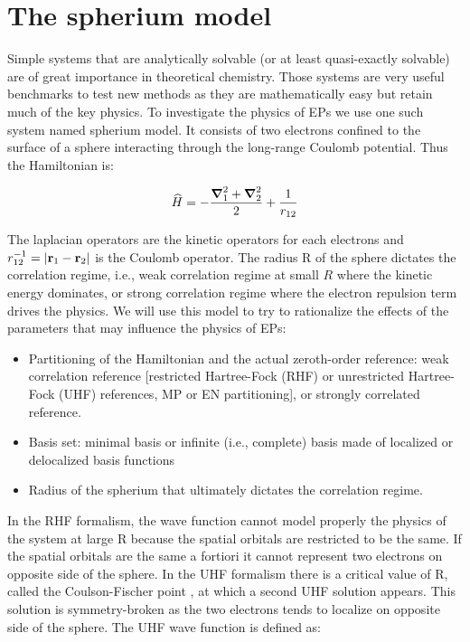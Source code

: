 \documentclass[11pt,a4paper]{article}
\begin{document}
\section{The spherium model}\label{sec:spherium}

Simple systems that are analytically solvable (or at least quasi-exactly solvable) are of great importance in theoretical chemistry. Those systems are very useful benchmarks to test new methods as they are mathematically easy but retain much of the key physics. To investigate the physics of EPs we use one such system named spherium model. It consists of two electrons confined to the surface of a sphere interacting through the long-range Coulomb potential. Thus the Hamiltonian is:

\begin{equation}
\widehat{H} = -\frac{\grad_1^2 + \grad_2^2}{2} + \frac{1}{r_{12}}
\end{equation}

The laplacian operators are the kinetic operators for each electrons and $r_{12}^{-1} = \abs{\vb{r}_1 - \vb{r}_2}$ is the Coulomb operator. The radius R of the sphere dictates the correlation regime, i.e., weak correlation regime at small $R$ where the kinetic energy dominates, or strong correlation regime where the electron repulsion term drives the physics. We will use this model to try to rationalize the effects of the parameters that may influence the physics of EPs:
\begin{itemize}
	\item Partitioning of the Hamiltonian and the actual zeroth-order reference: weak correlation reference [restricted Hartree-Fock (RHF) or unrestricted Hartree-Fock (UHF) references, MP or EN partitioning], or strongly correlated reference.
	\item Basis set: minimal basis or infinite (i.e., complete) basis made of localized or delocalized basis functions
	\item Radius of the spherium that ultimately dictates the correlation regime.
\end{itemize}

In the RHF formalism, the wave function cannot model properly the physics of the system at large R because the spatial orbitals are restricted to be the same. If the spatial orbitals are the  same a fortiori it cannot represent two electrons on opposite side of the sphere. In the UHF formalism there is a critical value of R, called the Coulson-Fischer point \cite{Coulson_1949}, at which a second UHF solution appears. This solution is symmetry-broken as the two electrons tends to localize on opposite side of the sphere. The UHF wave function is defined as:
\end{document}
